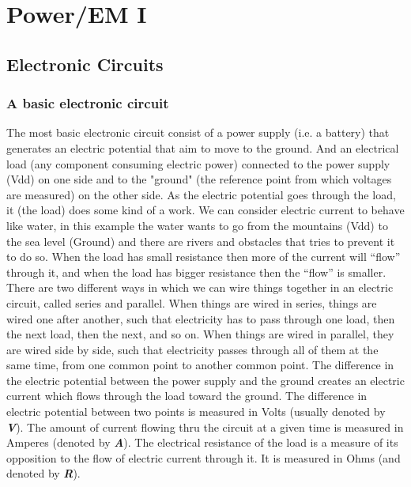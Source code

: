 \chapter{Power/EM I} \label{c4_forthchapter:cha}
\section{Electronic Circuits}
\subsection{A basic electronic circuit}
The most basic electronic circuit consist of a power supply (i.e. a battery) that generates an electric potential that aim to move to the ground. And an electrical load (any component consuming electric power) connected to the power supply (Vdd) on one side and to the "ground" (the reference point from which voltages are measured) on the other side. As the electric potential goes through the load, it (the load) does some kind of a work. We can consider electric current to behave like water, in this example the water wants to go from the mountains (Vdd) to the sea level (Ground) and there are rivers and obstacles that tries to prevent it to do so. When the load has small resistance then more of the current will “flow” through it, and when the load has bigger resistance then the “flow” is smaller.  
There are two different ways in which we can wire things together in an electric circuit, called series and parallel.
When things are wired in series, things are wired one after another, such that electricity has to pass through one load, then the next load, then the next, and so on.
When things are wired in parallel, they are wired side by side, such that electricity passes through all of them at the same time, from one common point to another common point.
The difference in the electric potential between the power supply and the ground creates an electric current which flows through the load toward the ground.
The difference in electric potential between two points is measured in Volts (usually denoted by \textbf{\textit{V}}). The amount of current flowing thru the circuit at a given time is measured in Amperes (denoted by \textbf{\textit{A}}).
The electrical resistance of the load is a measure of its opposition to the flow of electric current through it. It is measured in Ohms (and denoted by \textbf{\textit{R}}).

